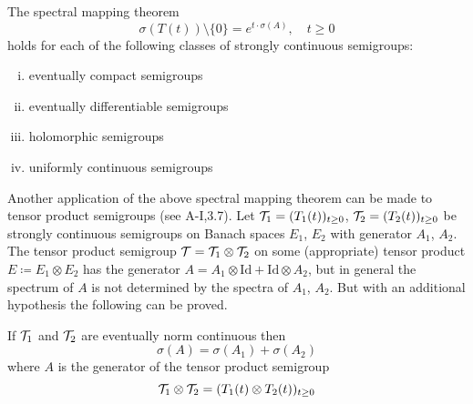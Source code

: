 \begin{corollary}\label{cor:a3-6.7}
The spectral mapping theorem
\[
\sigma(T(t)) \setminus \{0\} = e^{t \cdot \sigma(A)}, \quad t \geq 0
\]
holds for each of the following classes of strongly continuous semigroups:
\begin{enumerate}[(i)]
\item 
eventually compact semigroups

\item 
eventually differentiable semigroups

\item 
holomorphic semigroups

\item 
uniformly continuous semigroups
\end{enumerate}
\end{corollary}
Another application of the above spectral mapping theorem can be made to tensor product semigroups (see A-I,3.7).
Let $\mathcal{T}_{1} = (T_{1}(t))_{t\geq 0}$, $\mathcal{T}_{2} = (T_{2}(t))_{t\geq 0}$ be strongly continuous semigroups on Banach spaces $E_{1}$, $E_{2}$ with generator $A_{1}$, $A_{2}$.
The tensor product semigroup $\mathcal{T} = \mathcal{T}_{1} \otimes \mathcal{T}_{2}$ on some (appropriate) tensor product $E \coloneqq E_{1} \otimes E_{2}$ has the generator $A = A_{1}\otimes\text{Id} + \text{Id}\otimes A_{2}$, but in general the spectrum of $A$ is not determined by the spectra of $A_{1}$, $A_{2}$.
But with an additional hypothesis the following can be proved.
\begin{corollary}\label{cor:a3-6.8}
If $\mathcal{T}_{1}$ and $\mathcal{T}_{2}$ are eventually norm continuous then
\[
	\sigma(A) = \sigma(A_{1}) + \sigma(A_{2})
\]
where $A$ is the generator of the tensor product semigroup
\[
	\mathcal{T}_{1} \otimes \mathcal{T}_{2} = (T_{1}(t) \otimes T_{2}(t))_{t\geq 0}
\]
\end{corollary}
